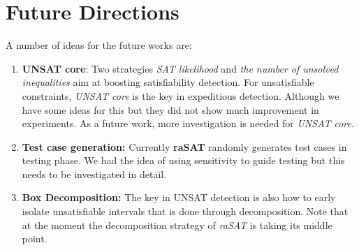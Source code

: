 \section*{Future Directions}
A number of ideas for the future works are:
\begin{enumerate}
\item \textbf{UNSAT core}: Two strategies \emph{SAT likelihood} and \emph{the number of unsolved inequalities} aim at boosting satisfiability detection. For unsatisfiable constraints, \emph{UNSAT core} is the key in expeditious detection. Although we have some ideas for this but they did not show much improvement in experiments. As a future work, more investigation is needed for \emph{UNSAT core}.
\item \textbf{Test case generation:} Currently \textbf{raSAT} randomly generates test cases in testing phase. We had the idea of using sensitivity to guide testing but this needs to be investigated in detail.
\item \textbf{Box Decomposition:} The key in UNSAT detection is also how to early isolate unsatisfiable intervals that is done through decomposition. Note that at the moment the decomposition strategy of \emph{raSAT} is taking its middle point.
\end{enumerate}